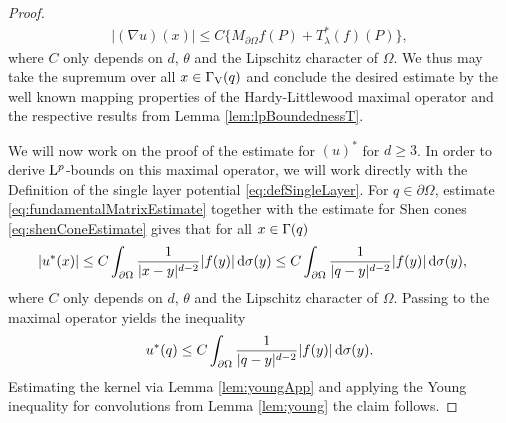 \begin{proof}
  \begin{align*}
    |(\nabla u)(x)| \leq C \Big\{ M_{\partial\Omega} f(P) + T_\lambda^*(f)(P) \Big\},
  \end{align*}
  where $C$ only depends on $d$, $\theta$ and the Lipschitz character of $\Omega$.
  We thus may take the supremum over all $x \in \Gamma_\mathrm{V}(q)$ and conclude the desired estimate by the well known mapping properties of the Hardy-Littlewood maximal operator and the respective results from Lemma \ref{lem:lpBoundednessT}.

  We will now work on the proof of the estimate for $(u)^*$ for $d \geq 3$.
  In order to derive $\mathrm{L}^p$-bounds on this maximal operator, we will work directly with the Definition of the single layer potential \eqref{eq:defSingleLayer}.
  For $q \in \partial\Omega$, estimate \eqref{eq:fundamentalMatrixEstimate} together with the estimate for Shen cones \eqref{eq:shenConeEstimate} gives that for all $x \in \Gamma(q)$
  \begin{align*}
    |u^*(x)| 
    &\leq  C \int_{\partial\Omega} \frac{1}{|x - y|^{d - 2}} |f(y)| \, {\operatorname{d}\!{\sigma}}(y) 
    \leq  C \int_{\partial\Omega} \frac{1}{|q - y|^{d - 2}} |f(y)| \, {\operatorname{d}\!{\sigma}}(y),
  \end{align*}
  where $C$ only depends on $d$, $\theta$ and the Lipschitz character of $\Omega$.
  Passing to the maximal operator yields the inequality
  \begin{align*}
    u^*(q) \leq  C \int_{\partial\Omega} \frac{1}{|q - y|^{d - 2}} |f(y)| \, {\operatorname{d}\!{\sigma}}(y).
  \end{align*}
  Estimating the kernel via Lemma \ref{lem:youngApp} and applying the Young inequality for convolutions from Lemma \ref{lem:young} the claim follows.
\end{proof}

